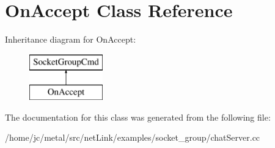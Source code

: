 \hypertarget{classOnAccept}{}\section{On\+Accept Class Reference}
\label{classOnAccept}
Inheritance diagram for On\+Accept\+:\begin{figure}[H]
\begin{center}
\leavevmode
\includegraphics[height=2.000000cm]{classOnAccept}
\end{center}
\end{figure}


The documentation for this class was generated from the following file\+:\begin{DoxyCompactItemize}
\item 
/home/jc/metal/src/net\+Link/examples/socket\+\_\+group/chat\+Server.\+cc\end{DoxyCompactItemize}
